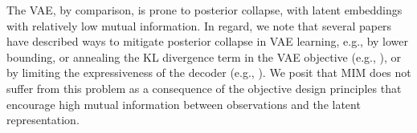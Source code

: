 
The VAE, by comparison, is prone to posterior collapse, with latent embeddings 
with relatively low mutual information. In regard, we note that several 
papers have described ways to mitigate posterior collapse in VAE learning, e.g., 
by lower bounding, or annealing the KL divergence term in the VAE objective 
(e.g., \citep{DBLP:journals/corr/abs-1711-00464,DBLP:journals/corr/abs-1901-03416}), 
or by limiting the expressiveness of the decoder (e.g., \citep{ChenKSDDSSA16}).
We posit that MIM does not suffer from this problem as a consequence of 
the objective design principles that encourage high mutual information
between observations and the latent representation.



